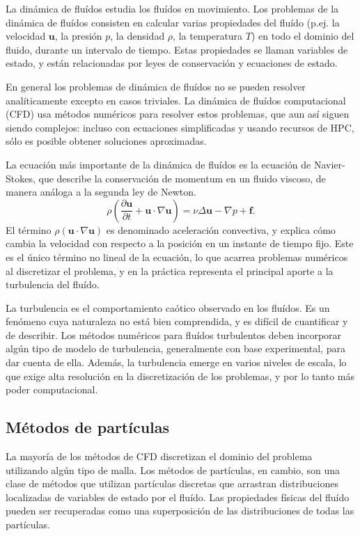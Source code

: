 \documentclass[11pt,spanish]{article}
\newcommand{\vel}{\mathbf{u}}
\begin{document}
La dinámica de fluídos estudia los fluídos en movimiento.  Los problemas de la
dinámica de fluídos consisten en calcular varias propiedades del fluído (p.ej.
la velocidad $\vel$, la presión $p$, la densidad $\rho$, la temperatura $T$) en
todo el dominio del fluido, durante un intervalo de tiempo.  Estas propiedades
se llaman variables de estado, y están relacionadas por leyes de conservación y
ecuaciones de estado.

En general los problemas de dinámica de fluídos no se pueden resolver
analíticamente excepto en casos triviales.  La dinámica de fluídos computacional
(CFD) usa métodos numéricos para resolver estos problemas, que aun así siguen
siendo complejos:  incluso con ecuaciones simplificadas y usando recursos de
HPC, sólo es posible obtener soluciones aproximadas.

La ecuación más importante de la dinámica de fluídos es la ecuación de
Navier-Stokes, que describe la conservación de momentum en un fluido viscoso,
de manera análoga a la segunda ley de Newton.  
\begin{equation}
    \rho\left(\frac{\partial\vel}{\partial t} + \vel\cdot\nabla\vel \right) =
    \nu\Delta\vel - \nabla p + \mathbf{f}.
\end{equation}
El término $\rho(\vel\cdot\nabla\vel)$ es denominado aceleración convectiva, y
explica cómo cambia la velocidad con respecto a la posición en un instante de
tiempo fijo.  Este es el único término no lineal de la ecuación, lo que acarrea
problemas numéricos al discretizar el problema, y en la práctica representa el
principal aporte a la turbulencia del fluído.

La turbulencia es el comportamiento caótico observado en los fluídos.  Es un
fenómeno cuya naturaleza no está bien comprendida, y es difícil de cuantificar y
de describir.  Los métodos numéricos para fluídos turbulentos deben incorporar
algún tipo de modelo de turbulencia, generalmente con base experimental, para
dar cuenta de ella.  Además, la turbulencia emerge en varios niveles de escala,
lo que exige alta resolución en la discretización de los problemas, y por lo
tanto más poder computacional.

\subsection{Métodos de partículas}
La mayoría de los métodos de CFD discretizan el dominio del problema utilizando
algún tipo de malla.  Los métodos de partículas, en cambio, son una clase
de métodos que utilizan partículas discretas que arrastran distribuciones
localizadas de variables de estado por el fluído.  Las propiedades físicas del
fluído pueden ser recuperadas como una superposición de las distribuciones
de todas las partículas.
\end{document}
